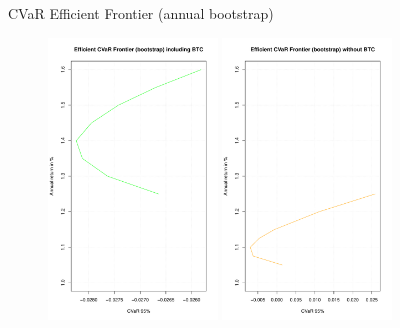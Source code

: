 \documentclass{beamer}
\begin{document}
\begin{frame}{CVaR Efficient Frontier (annual bootstrap)}
\begin{figure}
	\includegraphics[width=0.4\textwidth]{frontier_bootstrap_btc.pdf}
	\includegraphics[width=0.4\textwidth]{frontier_bootstrap_nobtc.pdf}

\end{figure}
\end{frame}
\end{document}
